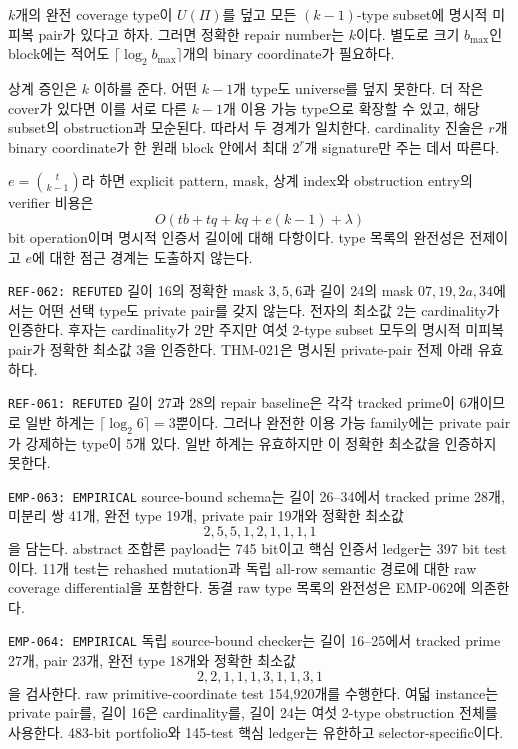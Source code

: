 \documentclass[11pt]{article}
\begin{document}
{}
\(k\)개의 완전 coverage type이 \(U(\Pi)\)를 덮고 모든
\((k-1)\)-type subset에 명시적 미피복 pair가 있다고 하자. 그러면
정확한 repair number는 \(k\)이다. 별도로 크기 \(b_{\max}\)인
block에는 적어도 \(\lceil\log_2b_{\max}\rceil\)개의 binary
coordinate가 필요하다.

\begin{claimproof}
상계 증인은 \(k\) 이하를 준다. 어떤 \(k-1\)개 type도 universe를
덮지 못한다. 더 작은 cover가 있다면 이를 서로 다른 \(k-1\)개 이용
가능 type으로 확장할 수 있고, 해당 subset의 obstruction과 모순된다.
따라서 두 경계가 일치한다. cardinality 진술은 \(r\)개 binary
coordinate가 한 원래 block 안에서 최대 \(2^r\)개 signature만 주는
데서 따른다.

\(e=\binom{t}{k-1}\)라 하면 explicit pattern, mask, 상계 index와
obstruction entry의 verifier 비용은
\[
 O(tb+tq+kq+e(k-1)+\lambda)
\]
bit operation이며 명시적 인증서 길이에 대해 다항이다. type 목록의
완전성은 전제이고 \(e\)에 대한 점근 경계는 도출하지 않는다.
\end{claimproof}

{\texttt{REF-062: REFUTED}}
길이 16의 정확한 mask \(3,5,6\)과 길이 24의 mask
\(07,19,2a,34\)에서는 어떤 선택 type도 private pair를 갖지 않는다.
전자의 최소값 2는 cardinality가 인증한다. 후자는 cardinality가 2만
주지만 여섯 2-type subset 모두의 명시적 미피복 pair가 정확한 최소값
3을 인증한다. THM-021은 명시된 private-pair 전제 아래 유효하다.

{\texttt{REF-061: REFUTED}}
길이 27과 28의 repair baseline은 각각 tracked prime이 6개이므로 일반
하계는 \(\lceil\log_2 6\rceil=3\)뿐이다. 그러나 완전한 이용 가능
family에는 private pair가 강제하는 type이 5개 있다. 일반 하계는
유효하지만 이 정확한 최소값을 인증하지 못한다.

{\texttt{EMP-063: EMPIRICAL}}
source-bound schema는 길이 26--34에서 tracked prime 28개, 미분리 쌍
41개, 완전 type 19개, private pair 19개와 정확한 최소값
\[
 2,5,5,1,2,1,1,1,1
\]
을 담는다. abstract 조합론 payload는 745 bit이고 핵심 인증서
ledger는 397 bit test이다. 11개 test는 rehashed mutation과 독립
all-row semantic 경로에 대한 raw coverage differential을 포함한다.
동결 raw type 목록의 완전성은 EMP-062에 의존한다.

{\texttt{EMP-064: EMPIRICAL}}
독립 source-bound checker는 길이 16--25에서 tracked prime 27개,
pair 23개, 완전 type 18개와 정확한 최소값
\[
 2,2,1,1,1,3,1,1,3,1
\]
을 검사한다. raw primitive-coordinate test 154,920개를 수행한다.
여덟 instance는 private pair를, 길이 16은 cardinality를, 길이 24는
여섯 2-type obstruction 전체를 사용한다. 483-bit portfolio와
145-test 핵심 ledger는 유한하고 selector-specific이다.
\end{document}
